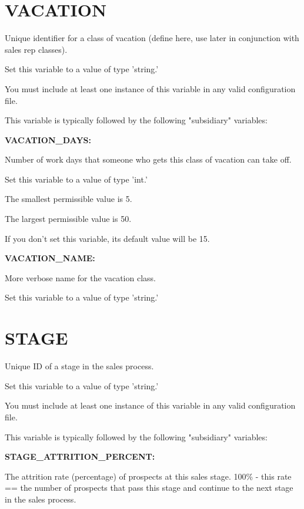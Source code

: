 \def\MyPath{/home/idan/confedit/src/schema.tex}
\def\MyTitle{Configuration file syntax}
\def\MyDate{2024-04-20}






\section{VACATION}


Unique identifier for a class of vacation (define here, use later in conjunction with sales rep classes).

Set this variable to a value of type 'string.'

You must include at least one instance of this variable in any valid configuration file.

This variable is typically followed by the following "subsidiary" variables:


\textbf{VACATION\_DAYS:}


Number of work days that someone who gets this class of vacation can take off.

Set this variable to a value of type 'int.'

The smallest permissible value is 5.

The largest permissible value is 50.

If you don't set this variable, its default value will be 15.


\textbf{VACATION\_NAME:}


More verbose name for the vacation class.

Set this variable to a value of type 'string.'


\section{STAGE}


Unique ID of a stage in the sales process.

Set this variable to a value of type 'string.'

You must include at least one instance of this variable in any valid configuration file.

This variable is typically followed by the following "subsidiary" variables:


\textbf{STAGE\_ATTRITION\_PERCENT:}


The attrition rate (percentage) of prospects at this sales stage.  100\% - this rate == the number of prospects that pass this stage and continue to the next stage in the sales process.

